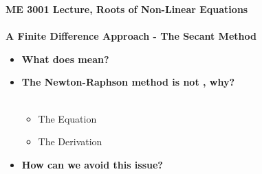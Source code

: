 \documentclass[11pt]{article}
\newcommand{\K}{\color{black}}
\newcommand{\PR}{\color{mypurple}}
\begin{document}
\textbf{ \LARGE ME 3001 Lecture, Roots of Non-Linear Equations} \\\\
\textbf{ \LARGE A Finite Difference Approach - The Secant Method } \\

\begin{itemize}
\Large
	\item \textbf{What does \PR{secant} \K mean?} \vspace{30mm}\\
	\item \textbf{The Newton-Raphson method is not \PR{purely numerical}\K, why?} \\\\
		\begin{itemize}
			\item  The Equation\vspace{30mm}	\\
			\item  The Derivation\vspace{30mm}	\\
		\end{itemize}
	\item \textbf{\LARGE  How can we avoid this issue?}\\\\


\end{itemize}
\end{document}
